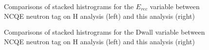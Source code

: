 \begin{figure}[!htbp]
    \centering
    
    \caption{Comparisons of stacked histrograms for the $E_{rec}$ variable between NCQE neutron tag on H analysis (left) and this analysis (right)} \label{fig:erec_reduction} 
    
      \hfill 
     \par
    
        
\end{figure}

\begin{figure}[!htbp]
    \centering
    
    \caption{Comparisons of stacked histrograms for the Dwall variable between NCQE neutron tag on H analysis (left) and this analysis (right)} \label{fig:dwall_reduction} 
    
      \hfill 
      \par
    
        
\end{figure}

